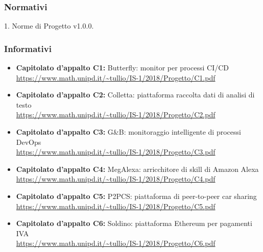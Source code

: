 \subsubsection{Normativi}
1. Norme di Progetto v1.0.0.
	
\subsubsection{Informativi}
\begin{itemize}
\item \textbf{Capitolato d’appalto C1:} Butterfly: monitor per processi CI/CD\\
\url{https://www.math.unipd.it/~tullio/IS-1/2018/Progetto/C1.pdf}
\item \textbf{Capitolato d’appalto C2:} Colletta: piattaforma raccolta dati di analisi di testo\\
\url{https://www.math.unipd.it/~tullio/IS-1/2018/Progetto/C2.pdf}
\item \textbf{Capitolato d’appalto C3:} G\&B: monitoraggio intelligente di processi DevOps\\
\url{https://www.math.unipd.it/~tullio/IS-1/2018/Progetto/C3.pdf}
\item \textbf{Capitolato d’appalto C4:} MegAlexa: arricchitore di skill di Amazon Alexa\\
\url{https://www.math.unipd.it/~tullio/IS-1/2018/Progetto/C4.pdf}
\item \textbf{Capitolato d’appalto C5:} P2PCS: piattaforma di peer-to-peer car sharing	\\
\url{https://www.math.unipd.it/~tullio/IS-1/2018/Progetto/C5.pdf}
\item \textbf{Capitolato d’appalto C6:} Soldino: piattaforma Ethereum per pagamenti IVA\\
\url{https://www.math.unipd.it/~tullio/IS-1/2018/Progetto/C6.pdf}
\end{itemize}
